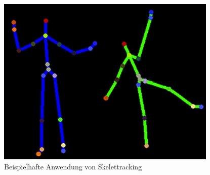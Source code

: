 \begin{figure}[h]
	\center
	\includegraphics[scale=0.8]{graphics/skelettracking.jpg}
	\caption{\label{fig:skelettracking} Beispielhafte Anwendung von Skelettracking\cite{kinect_5}}
\end{figure}



